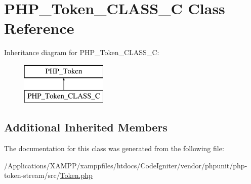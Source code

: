 \hypertarget{class_p_h_p___token___c_l_a_s_s___c}{}\section{P\+H\+P\+\_\+\+Token\+\_\+\+C\+L\+A\+S\+S\+\_\+C Class Reference}
\label{class_p_h_p___token___c_l_a_s_s___c}
Inheritance diagram for P\+H\+P\+\_\+\+Token\+\_\+\+C\+L\+A\+S\+S\+\_\+C\+:\begin{figure}[H]
\begin{center}
\leavevmode
\includegraphics[height=2.000000cm]{class_p_h_p___token___c_l_a_s_s___c}
\end{center}
\end{figure}
\subsection*{Additional Inherited Members}


The documentation for this class was generated from the following file\+:\begin{DoxyCompactItemize}
\item 
/\+Applications/\+X\+A\+M\+P\+P/xamppfiles/htdocs/\+Code\+Igniter/vendor/phpunit/php-\/token-\/stream/src/\mbox{\hyperlink{_token_8php}{Token.\+php}}\end{DoxyCompactItemize}
